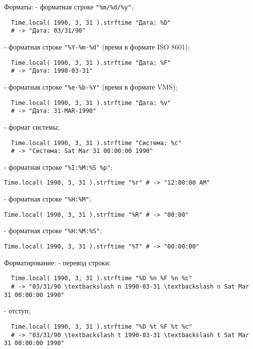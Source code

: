 \begin{keylist}{Форматы:}
   - форматная строке \verb!"%m/%d/%y"!;
  
  \begin{verbatim}
  Time.local( 1990, 3, 31 ).strftime "Дата: %D"
  # -> "Дата: 03/31/90"
  \end{verbatim} 
     
   - форматная строке \verb!"%Y-%m-%d"! (время в формате ISO 8601); 
  \begin{verbatim}
  Time.local( 1990, 3, 31 ).strftime "Дата: %F"
  # -> "Дата: 1990-03-31"
  \end{verbatim}   
   
   - форматная строке \verb!"%e-%b-%Y"! (время в формате VMS); 
  \begin{verbatim}
  Time.local( 1990, 3, 31 ).strftime "Дата: %v"
  # -> "Дата: 31-MAR-1990"
  \end{verbatim}   
   
   - формат системы;
  \begin{verbatim}
  Time.local( 1990, 3, 31 ).strftime "Система: %c"
  # -> "Система: Sat Mar 31 00:00:00 1990"
  \end{verbatim}
   
   - форматная строке \verb!"%I:%M:%S %p"!; 
  
  \verb!Time.local( 1990, 3, 31 ).strftime "%r" # -> "12:00:00 AM"!    
   
   - форматная строке \verb!"%H:%M"!; 
  
  \verb!Time.local( 1990, 3, 31 ).strftime "%R" # -> "00:00"!    
   
   - форматная строке \verb!"%H:%M:%S"!; 
  
  \verb!Time.local( 1990, 3, 31 ).strftime "%T" # -> "00:00:00"!    
\end{keylist}

\begin{keylist}{Форматирование:}
   - перевод строки;
  \begin{verbatim}
  Time.local( 1990, 3, 31 ).strftime "%D %n %F %n %c"
  # -> "03/31/90 \textbackslash n 1990-03-31 \textbackslash n Sat Mar 31 00:00:00 1990"
  \end{verbatim}    
   
   - отступ;
  \begin{verbatim}
  Time.local( 1990, 3, 31 ).strftime "%D %t %F %t %c"
  # -> "03/31/90 \textbackslash t 1990-03-31 \textbackslash t Sat Mar 31 00:00:00 1990"
  \end{verbatim}   
\end{keylist}

